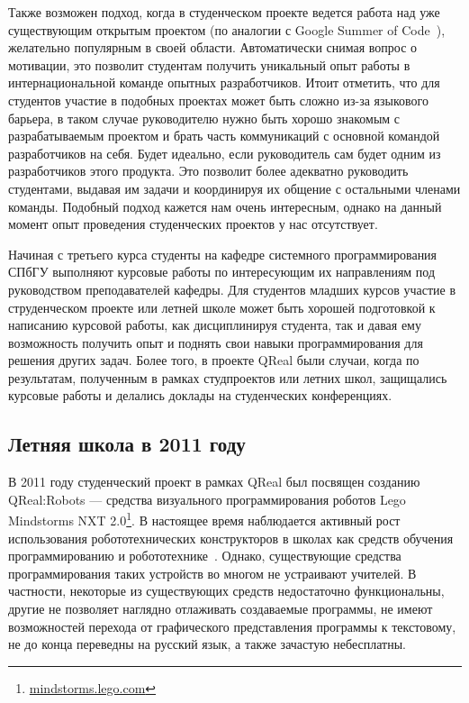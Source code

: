 \documentclass[a4paper]{article}
\begin{document}
Также возможен подход, когда в студенческом проекте ведется работа над уже существующим открытым проектом (по аналогии с Google Summer of Code~\cite{google}), желательно популярным в своей области. Автоматически снимая вопрос о мотивации, это позволит студентам получить уникальный опыт работы в интернациональной команде опытных разработчиков. Итоит отметить, что для студентов участие в подобных проектах может быть сложно из-за языкового барьера, в таком случае руководителю нужно быть хорошо знакомым с разрабатываемым проектом и брать часть коммуникаций с основной командой разработчиков на себя. Будет идеально, если руководитель сам будет одним из разработчиков этого продукта. Это позволит более адекватно руководить студентами, выдавая им задачи и координируя их общение с остальными членами команды. Подобный подход кажется нам очень интересным, однако на данный момент опыт проведения студенческих проектов у нас отсутствует.


Начиная с третьего курса студенты на кафедре системного программирования СПбГУ выполняют курсовые работы по интересующим их направлениям под руководством преподавателей кафедры. Для студентов младших курсов участие в струденческом проекте или летней школе может быть хорошей подготовкой к написанию курсовой работы, как дисциплинируя студента, так и давая ему возможность получить опыт и поднять свои навыки программирования для решения других задач. Более того, в проекте QReal были случаи, когда по результатам, полученным в рамках студпроектов или летних школ, защищались курсовые работы и делались доклады на студенческих конференциях.
 
\subsection{Летняя школа в 2011 году}

В 2011 году студенческий проект в рамках QReal был посвящен созданию QReal:Robots --- средства визуального программирования роботов Lego Mindstorms NXT 2.0\footnote{\url{mindstorms.lego.com}}. В настоящее время наблюдается активный рост использования робототехнических конструкторов в школах как средств обучения программированию и робототехнике~\cite{filippov}. Однако, существующие средства программирования таких устройств во многом не устраивают учителей. В частности, некоторые из существующих средств недостаточно функциональны, другие не позволяет наглядно отлаживать создаваемые программы, не имеют возможностей перехода от графического представления программы к текстовому, не до конца переведны на русский язык, а также зачастую небесплатны.
\end{document}

